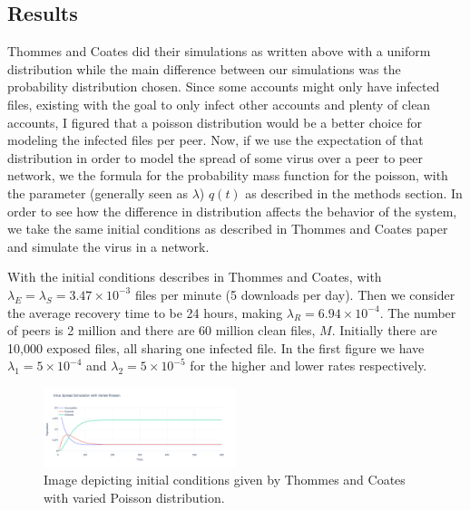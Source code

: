 \documentclass[12pt, oneside]{article}
\begin{document}
    \subsection{Results}
        Thommes and Coates did their simulations as written above with a uniform distribution while the main difference between our simulations was the probability distribution chosen.
        Since some accounts might only have infected files, existing with the goal to only infect other accounts and plenty of clean accounts, I figured that a poisson distribution
        would be a better choice for modeling the infected files per peer. Now, if we use the expectation of that distribution in order to model the spread of some 
        virus over a peer to peer network, we the formula for the probability mass function for the poisson, with the parameter (generally seen as $\lambda$) $q(t)$ as described in the 
        methods section. In order to see how the difference in distribution affects the behavior of the system, we take the same initial conditions as described in Thommes and Coates paper
        and simulate the virus in a network.\newline

        With the initial conditions describes in Thommes and Coates, with $\lambda_E = \lambda_S=3.47\times 10^{-3}$ files per minute (5 downloads per day). Then we consider the average recovery
        time to be 24 hours, making $\lambda_R=6.94\times 10^{-4}$. The number of peers is 2 million and there are 60 million clean files, $M$. Initially there are 10,000 exposed files, all sharing one
        infected file. In the first figure we have $\lambda_1=5\times 10^{-4}$ and $\lambda_2=5\times 10^{-5}$ for the higher and lower rates respectively.
        \begin{figure}[htbp]
            \centering
            \includegraphics[width=0.5\textwidth]{2MPoisson.png}
            \caption{Image depicting initial conditions given by Thommes and Coates with varied Poisson distribution.}
        \end{figure}
\end{document}
